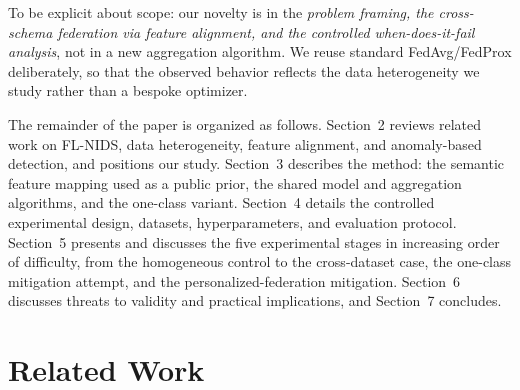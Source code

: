 \documentclass[11pt,a4paper]{article}
\begin{document}
To be explicit about scope: our novelty is in the \emph{problem framing, the
cross-schema federation via feature alignment, and the controlled
when-does-it-fail analysis},
not in a new aggregation algorithm. We reuse standard FedAvg/FedProx deliberately,
so that the observed behavior reflects the data heterogeneity we study rather than
a bespoke optimizer.

The remainder of the paper is organized as follows. Section~2 reviews related
work on FL-NIDS, data heterogeneity, feature alignment, and anomaly-based
detection, and positions our study. Section~3 describes the method: the semantic
feature mapping used as a public prior, the shared model and aggregation
algorithms, and the one-class variant. Section~4 details the controlled
experimental design, datasets, hyperparameters, and evaluation protocol.
Section~5 presents and discusses the five experimental stages in increasing order
of difficulty, from the homogeneous control to the cross-dataset case, the
one-class mitigation attempt, and the personalized-federation mitigation. Section~6 discusses threats to validity and
practical implications, and Section~7 concludes.

\section{Related Work}
\end{document}
